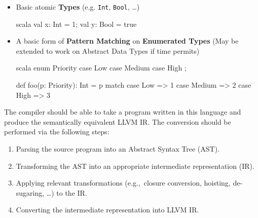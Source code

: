 \begin{itemize}
      \item Basic atomic \textbf{Types}
            (e.g. \texttt{Int}, \texttt{Bool}, \dots)
            \begin{code}{scala}
                  val x: Int = 1; val y: Bool = true
            \end{code}

      \item A basic form of \textbf{Pattern Matching} on \textbf{Enumerated Types}
            (May be extended to work on Abstract Data Types if time permits)
            \begin{code}{scala}
                  enum Priority {
                              case Low
                              case Medium
                              case High
                        };

                  def foo(p: Priority): Int = p match {
                              case Low => 1
                              case Medium => 2
                              case High => 3
                        }
            \end{code}

\end{itemize}

The compiler should be able to take a program written in this language and produce the semantically
equivalent LLVM IR. The conversion should be performed via the following steps:

\begin{enumerate}
      \item Parsing the source program into an Abstract Syntax Tree (AST).
      \item Transforming the AST into an appropriate intermediate representation (IR).
      \item Applying relevant transformations (e.g.,\ closure conversion, hoisting, de-sugaring,
            \dots) to the IR.
      \item Converting the intermediate representation into LLVM IR.
\end{enumerate}

